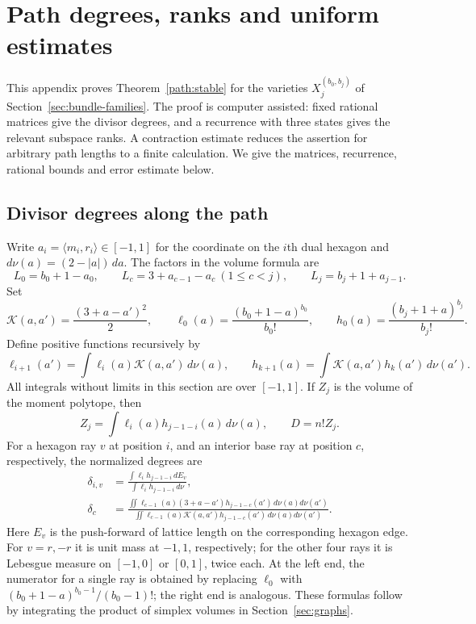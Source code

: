 \section{Path degrees, ranks and uniform estimates}\label{sec:paths}

This appendix proves Theorem~\ref{path:stable} for the varieties
$X_j^{(b_0,b_j)}$ of Section~\ref{sec:bundle-families}.
The proof is computer assisted: fixed rational matrices give the divisor
degrees, and a recurrence with three states gives the relevant subspace ranks.
A contraction estimate reduces the assertion for arbitrary path lengths to a
finite calculation. We give the matrices, recurrence, rational bounds and
error estimate below.

\subsection{Divisor degrees along the path}
Write $a_i=\langle m_i,r_i\rangle\in[-1,1]$ for the coordinate on the
$i$th dual hexagon and $d\nu(a)=(2-|a|)\,da$. The factors in the volume formula are
\[
 L_0=b_0+1-a_0,\qquad L_c=3+a_{c-1}-a_c\ (1\le c<j),
 \qquad L_j=b_j+1+a_{j-1}.
\]
Set
\begin{equation}\label{path:kernel}
 \mathcal K(a,a')=\frac{(3+a-a')^2}{2},\qquad
 \ell_0(a)=\frac{(b_0+1-a)^{b_0}}{b_0!},\qquad
 h_0(a)=\frac{(b_j+1+a)^{b_j}}{b_j!}.
\end{equation}
Define positive functions recursively by
\begin{equation}\label{path:chains}
 \ell_{i+1}(a')=\int\ell_i(a)\mathcal K(a,a')\,d\nu(a),\qquad
 h_{k+1}(a)=\int\mathcal K(a,a')h_k(a')\,d\nu(a').
\end{equation}
All integrals without limits in this section are over $[-1,1]$. If $Z_j$ is
the volume of the moment polytope, then
\[
 Z_j=\int\ell_i(a)h_{j-1-i}(a)\,d\nu(a),\qquad D=n!Z_j.
\]
For a hexagon ray $v$ at position $i$, and an interior base ray at position $c$,
respectively, the normalized degrees are
\begin{align}
 \delta_{i,v}&=\frac{\int\ell_i h_{j-1-i}\,dE_v}
                         {\int\ell_i h_{j-1-i}\,d\nu},\label{path:hexdegree}\\
 \delta_c&=\frac{\iint\ell_{c-1}(a)(3+a-a')h_{j-1-c}(a')\,d\nu(a)d\nu(a')}
 {\iint\ell_{c-1}(a)\mathcal K(a,a')h_{j-1-c}(a')\,d\nu(a)d\nu(a')}.
 \label{path:basedegree}
\end{align}
Here $E_v$ is the push-forward of lattice length on the corresponding hexagon
edge. For $v=r,-r$ it is unit mass at $-1,1$, respectively; for the other four
rays it is Lebesgue measure on $[-1,0]$ or $[0,1]$, twice each.
At the left end, the numerator for a single ray is obtained by replacing
$\ell_0$ with $(b_0+1-a)^{b_0-1}/(b_0-1)!$; the right end is analogous.
These formulas follow by integrating the product of simplex volumes in
Section~\ref{sec:graphs}.

